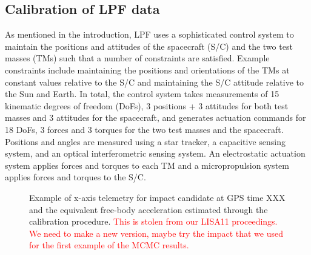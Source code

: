 \documentclass[preprint, trackchanges]{aastex61}
\newcommand{\red}[1]{\textcolor{red}{#1}}
\begin{document}
\subsection{Calibration of LPF data}\label{sec:calibration}
As mentioned in the introduction, LPF uses a sophisticated control system to maintain the positions and attitudes of the spacecraft (S/C) and the two test masses (TMs) such that a number of constraints are satisfied.  Example constraints include maintaining the positions and orientations of the TMs at constant values relative to the S/C and maintaining the S/C attitude relative to the Sun and Earth. In total, the control system takes measurements of 15 kinematic degrees of freedom (DoFs), 3 positions + 3 attitudes for both test masses and 3 attitudes for the spacecraft, and generates actuation commands for 18 DoFs, 3 forces and 3 torques for the two test masses and the spacecraft.  Positions and angles are measured using a star tracker, a capacitive sensing system, and an optical interferometric sensing system. An electrostatic actuation system applies forces and torques to each TM and a micropropulsion system applies forces and torques to the S/C. 

\begin{figure}
\caption{Example of x-axis telemetry for impact candidate at GPS time XXX and the equivalent free-body acceleration estimated through the calibration procedure.\label{fig:models} \red{This is stolen from our LISA11 proceedings. We need to make a new version, maybe try the impact that we used for the first example of the MCMC results.}}
\end{figure}
\end{document}
